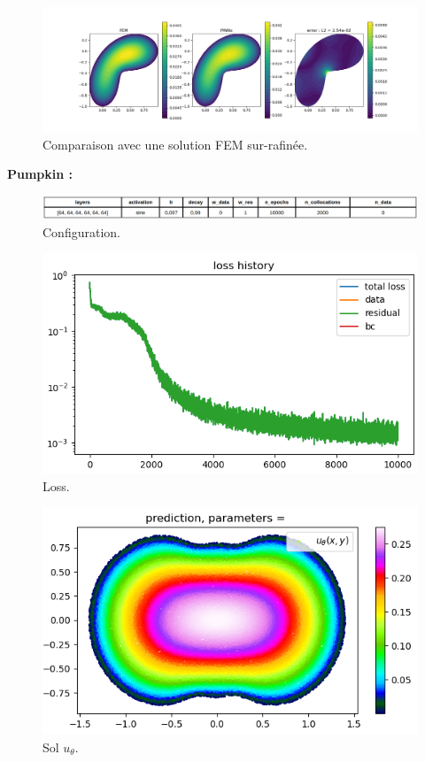 \documentclass[french]{article}
\begin{document}
	\begin{figure}[H]
		\centering
		\includegraphics[width=\linewidth]{"poisson/bean/compare_2.png"}
		\caption{Comparaison avec une solution FEM sur-rafinée.}
	\end{figure}
	
	\textbf{Pumpkin :}
	
	\begin{figure}[H]
		\centering
		\includegraphics[width=\linewidth]{"poisson/pumpkin/config.png"}
		\caption{Configuration.}
	\end{figure}
	
	\begin{minipage}{0.48\linewidth}
		\begin{figure}[H]
			\centering
			\includegraphics[width=0.9\linewidth]{"poisson/pumpkin/loss.png"}
			\caption{Loss.}
		\end{figure}
	\end{minipage}
	\begin{minipage}{0.48\linewidth}
		\begin{figure}[H]
			\centering
			\includegraphics[width=0.9\linewidth]{"poisson/pumpkin/sol.png"}
			\caption{Sol $u_\theta$.}
		\end{figure}
	\end{minipage}
	
\end{document}
